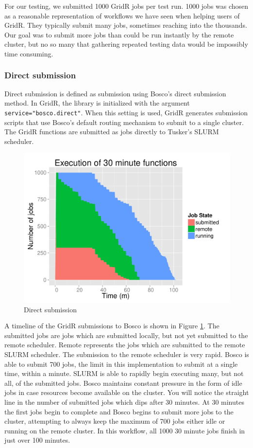 For our testing, we submitted 1000 GridR jobs per test run. 1000 jobs was chosen as a reasonable representation of workflows we have seen when helping users of GridR.  They typically submit many jobs, sometimes reaching into the thousands.  Our goal was to submit more jobs than could be run instantly by the remote cluster, but no so many that gathering repeated testing data would be impossibly time consuming.

\subsubsection{Direct submission}
Direct submission is defined as submission using Bosco's direct submission method.  In GridR, the library is initialized with the argument \texttt{service="bosco.direct"}.  When this setting is used, GridR generates submission scripts that use Bosco's default routing mechanism to submit to a single cluster.  The GridR functions are submitted as jobs directly to Tusker's SLURM scheduler.

\begin{figure}[ht!]
\centering
\includegraphics[width=\textwidth]{BoscoRImages/30minplot.pdf}

\caption{Direct submission}
\label{fig:directsubmit}
\end{figure}

A timeline of the GridR submissions to Bosco is shown in Figure \ref{fig:directsubmit}.  The submitted jobs are jobs which are submitted locally, but not yet submitted to the remote scheduler.  Remote represents the jobs which are submitted to the remote SLURM scheduler.  The submission to the remote scheduler is very rapid.  Bosco is able to submit 700 jobs, the limit in this implementation to submit at a single time, within a minute.  SLURM is able to rapidly begin executing many, but not all, of the submitted jobs.  Bosco maintains constant pressure in the form of idle jobs in case resources become available on the cluster.  You will notice the straight line in the number of submitted jobs which dips after 30 minutes.  At 30 minutes the first jobs begin to complete and Bosco begins to submit more jobs to the cluster, attempting to always keep the maximum of 700 jobs either idle or running on the remote cluster.  In this workflow, all 1000 30 minute jobs finish in just over 100 minutes.

